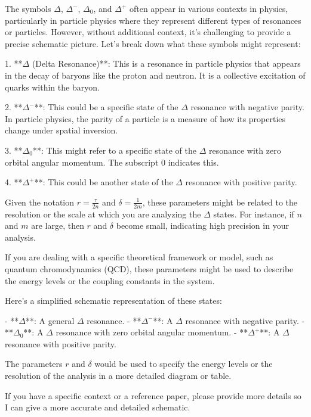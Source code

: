 The symbols \(\Delta\), \(\Delta^-\), \(\Delta_0\), and \(\Delta^+\) often appear in various contexts in physics, particularly in particle physics where they represent different types of resonances or particles. However, without additional context, it's challenging to provide a precise schematic picture. Let's break down what these symbols might represent:

1. **\(\Delta\) (Delta Resonance)**: This is a resonance in particle physics that appears in the decay of baryons like the proton and neutron. It is a collective excitation of quarks within the baryon.

2. **\(\Delta^-\)**: This could be a specific state of the \(\Delta\) resonance with negative parity. In particle physics, the parity of a particle is a measure of how its properties change under spatial inversion.

3. **\(\Delta_0\)**: This might refer to a specific state of the \(\Delta\) resonance with zero orbital angular momentum. The subscript 0 indicates this.

4. **\(\Delta^+\)**: This could be another state of the \(\Delta\) resonance with positive parity.

Given the notation \(r = \frac{\tau}{2n}\) and \(\delta = \frac{1}{2m}\), these parameters might be related to the resolution or the scale at which you are analyzing the \(\Delta\) states. For instance, if \(n\) and \(m\) are large, then \(r\) and \(\delta\) become small, indicating high precision in your analysis.

If you are dealing with a specific theoretical framework or model, such as quantum chromodynamics (QCD), these parameters might be used to describe the energy levels or the coupling constants in the system.

Here’s a simplified schematic representation of these states:

- **\(\Delta\)**: A general \(\Delta\) resonance.
- **\(\Delta^-\)**: A \(\Delta\) resonance with negative parity.
- **\(\Delta_0\)**: A \(\Delta\) resonance with zero orbital angular momentum.
- **\(\Delta^+\)**: A \(\Delta\) resonance with positive parity.

The parameters \(r\) and \(\delta\) would be used to specify the energy levels or the resolution of the analysis in a more detailed diagram or table.

If you have a specific context or a reference paper, please provide more details so I can give a more accurate and detailed schematic.